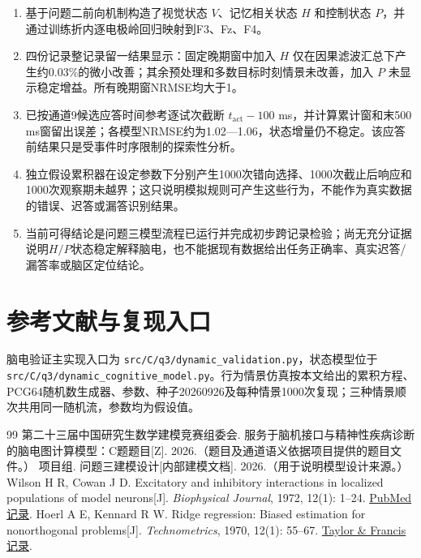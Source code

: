 \documentclass[UTF8,12pt,a4paper,fontset=windows]{ctexart}
\providecommand{\tightlist}{%
  \setlength{\itemsep}{0pt}\setlength{\parskip}{0pt}}
\begin{document}
\begin{enumerate}
\def\labelenumi{\arabic{enumi}.}
\tightlist
\item
  基于问题二前向机制构造了视觉状态 \(V\)、记忆相关状态 \(H\) 和控制状态 \(P\)，并通过训练折内逐电极岭回归映射到F3、Fz、F4。
\item
  四份记录整记录留一结果显示：固定晚期窗中加入 \(H\) 仅在因果滤波汇总下产生约0.03\%的微小改善；其余预处理和多数目标时刻情景未改善，加入 \(P\) 未显示稳定增益。所有晚期窗NRMSE均大于1。
\item
  已按通道9候选应答时间参考逐试次截断 \(t_{\mathrm{act}}-100\) ms，并计算累计窗和末500 ms窗留出误差；各模型NRMSE约为1.02---1.06，状态增量仍不稳定。该应答前结果只是受事件时序限制的探索性分析。
\item
  独立假设累积器在设定参数下分别产生1000次错向选择、1000次截止后响应和1000次观察期未越界；这只说明模拟规则可产生这些行为，不能作为真实数据的错误、迟答或漏答识别结果。
\item
  当前可得结论是问题三模型流程已运行并完成初步跨记录检验；尚无充分证据说明\(H/P\)状态稳定解释脑电，也不能据现有数据给出任务正确率、真实迟答/漏答率或脑区定位结论。
\end{enumerate}

\hypertarget{ux53c2ux8003ux6587ux732eux4e0eux590dux73b0ux5165ux53e3}{%
\section{参考文献与复现入口}\label{ux53c2ux8003ux6587ux732eux4e0eux590dux73b0ux5165ux53e3}}

脑电验证主实现入口为 \texttt{src/C/q3/dynamic\_validation.py}，状态模型位于 \texttt{src/C/q3/dynamic\_cognitive\_model.py}。行为情景仿真按本文给出的累积方程、PCG64随机数生成器、参数、种子20260926及每种情景1000次复现；三种情景顺次共用同一随机流，参数均为假设值。

\begin{thebibliography}{99}
 第二十三届中国研究生数学建模竞赛组委会. 服务于脑机接口与精神性疾病诊断的脑电图计算模型：C题题目[Z]. 2026.（题目及通道语义依据项目提供的题目文件。）
 项目组. 问题三建模设计[内部建模文档]. 2026.（用于说明模型设计来源。）
 Wilson H R, Cowan J D. Excitatory and inhibitory interactions in localized populations of model neurons[J]. \textit{Biophysical Journal}, 1972, 12(1): 1--24. \href{https://pubmed.ncbi.nlm.nih.gov/4332108/}{PubMed记录}.
 Hoerl A E, Kennard R W. Ridge regression: Biased estimation for nonorthogonal problems[J]. \textit{Technometrics}, 1970, 12(1): 55--67. \href{https://www.tandfonline.com/doi/abs/10.1080/00401706.1970.10488634}{Taylor \& Francis记录}.
\end{thebibliography}
\end{document}
